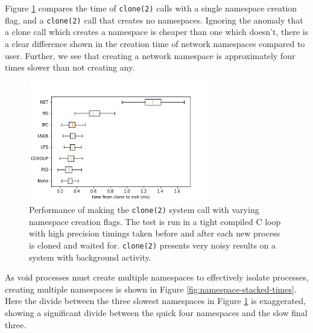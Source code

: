 \documentclass[12pt,a4paper,twoside]{report}
\begin{document}
Figure \ref{fig:namespace-times} compares the time of \texttt{clone(2)} calls with a single namespace creation flag, and a \texttt{clone(2)} call that creates no namespaces. Ignoring the anomaly that a clone call which creates a namespace is cheaper than one which doesn't, there is a clear difference shown in the creation time of network namespaces compared to user. Further, we see that creating a network namespace is approximately four times slower than not creating any.

\begin{figure}
    \centering
    \includegraphics[width=0.7\textwidth]{graphs/clone_individual_namespaces.png}

    \caption{Performance of making the \texttt{clone(2)} system call with varying namespace creation flags. The test is run in a tight compiled C loop with high precision timings taken before and after each new process is cloned and waited for. \texttt{clone(2)} presents very noisy results on a system with background activity.}
    \label{fig:namespace-times}
\end{figure}

As void processes must create multiple namespaces to effectively isolate processes, creating multiple namespaces is shown in Figure \ref{fig:namespace-stacked-times}. Here the divide between the three slowest namespaces in Figure \ref{fig:namespace-times} is exaggerated, showing a significant divide between the quick four namespaces and the slow final three.
\end{document}
